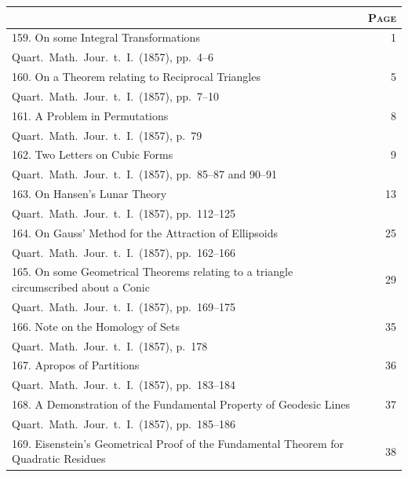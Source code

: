 \documentclass[11pt,a4paper]{book}
\begin{document}
\begin{longtable}{p{}r}
\toprule
\multicolumn{1}{c}{} & \multicolumn{1}{c}{\textsc{Page}} \\
\midrule
\endhead
159. On some Integral Transformations \dotfill & 1 \\
\multicolumn{2}{l}{\small Quart.\ Math.\ Jour.\ t.~I.\ (1857), pp.~4--6} \\[0.5em]
%
160. On a Theorem relating to Reciprocal Triangles \dotfill & 5 \\
\multicolumn{2}{l}{\small Quart.\ Math.\ Jour.\ t.~I.\ (1857), pp.~7--10} \\[0.5em]
%
161. A Problem in Permutations \dotfill & 8 \\
\multicolumn{2}{l}{\small Quart.\ Math.\ Jour.\ t.~I.\ (1857), p.~79} \\[0.5em]
%
162. Two Letters on Cubic Forms \dotfill & 9 \\
\multicolumn{2}{l}{\small Quart.\ Math.\ Jour.\ t.~I.\ (1857), pp.~85--87 and 90--91} \\[0.5em]
%
163. On Hansen's Lunar Theory \dotfill & 13 \\
\multicolumn{2}{l}{\small Quart.\ Math.\ Jour.\ t.~I.\ (1857), pp.~112--125} \\[0.5em]
%
164. On Gauss' Method for the Attraction of Ellipsoids \dotfill & 25 \\
\multicolumn{2}{l}{\small Quart.\ Math.\ Jour.\ t.~I.\ (1857), pp.~162--166} \\[0.5em]
%
165. On some Geometrical Theorems relating to a triangle circumscribed about a Conic \dotfill & 29 \\
\multicolumn{2}{l}{\small Quart.\ Math.\ Jour.\ t.~I.\ (1857), pp.~169--175} \\[0.5em]
%
166. Note on the Homology of Sets \dotfill & 35 \\
\multicolumn{2}{l}{\small Quart.\ Math.\ Jour.\ t.~I.\ (1857), p.~178} \\[0.5em]
%
167. Apropos of Partitions \dotfill & 36 \\
\multicolumn{2}{l}{\small Quart.\ Math.\ Jour.\ t.~I.\ (1857), pp.~183--184} \\[0.5em]
%
168. A Demonstration of the Fundamental Property of Geodesic Lines \dotfill & 37 \\
\multicolumn{2}{l}{\small Quart.\ Math.\ Jour.\ t.~I.\ (1857), pp.~185--186} \\[0.5em]
%
169. Eisenstein's Geometrical Proof of the Fundamental Theorem for Quadratic Residues \dotfill & 38 \\

\end{longtable}
\end{document}
